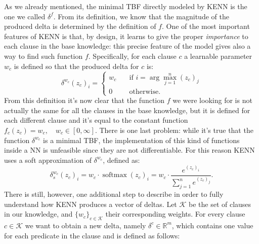 As we already mentioned, the minimal TBF directly modeled by KENN is the one we called $\delta^f$. From its definition, we know that the magnitude of the produced delta is determined by the definition of $f$. One of the most important features of KENN is that, by design, it learns to give the proper \textit{importance} to each clause in the base knowledge: this precise feature of the model gives also a way to find such function $f$. Specifically, for each clause $c$ a learnable parameter $w_c$ is defined so that the produced delta for $c$ is:
\begin{equation*}
	\delta^{w_c}(z_c)_i = 
	\begin{cases}
	w_c \quad &\text{if } i = \arg\max_{j=1}^n(z_c)_j \\
	0 \quad &\text{otherwise.}
	\end{cases}
	\end{equation*}
From this definition it's now clear that the function $f$ we were looking for is not actually the same for all the clauses in the base knowledge, but it is defined for each different clause and it's equal to the constant function $f_c(z_c) = w_c, \quad w_c \in \left[0, \infty\right]$. 
There is one last problem: while it's true that the function $\delta^{w_c}$ is a minimal TBF, the implementation of this kind of functions inside a NN is unfeasible since they are not differentiable. For this reason KENN uses a soft approximation of $\delta^{w_c}$, defined as:
\begin{equation}
	\delta_s^{w_c}(z_c)_i = w_c \cdot \operatorname{softmax}(z_c)_i = w_c \cdot \frac{e^{(z_c)_i}}{\sum_{j=1}^ne^{(z_c)_j}}.
	\label{eq:soft_approx_delta}
	\end{equation}
There is still, however, one additional step to describe in order to fully understand how KENN produces a vector of deltas. Let $\mathcal{K}$ be the set of clauses in our knowledge, and $\{w_c\}_{c\in\mathcal{K}}$ their corresponding weights. For every clause $c\in \mathcal{K}$ we want to obtain a new delta, namely $\delta^c \in \mathbb{R}^m$, which contains one value for each predicate in the clause and is defined as follows:
